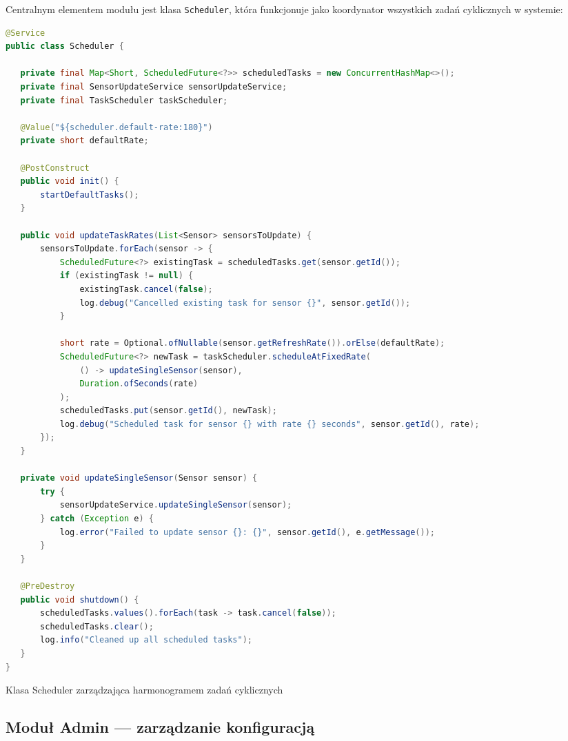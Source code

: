 \documentclass[a4paper,12pt,openany]{book}
\begin{document}
Centralnym elementem modułu jest klasa \texttt{Scheduler}, która funkcjonuje jako koordynator wszystkich zadań cyklicznych w systemie:


\vspace{1em}
\begin{lstlisting}[language=java]
@Service
public class Scheduler {

   private final Map<Short, ScheduledFuture<?>> scheduledTasks = new ConcurrentHashMap<>();
   private final SensorUpdateService sensorUpdateService;
   private final TaskScheduler taskScheduler;

   @Value("${scheduler.default-rate:180}")
   private short defaultRate;

   @PostConstruct
   public void init() {
       startDefaultTasks();
   }

   public void updateTaskRates(List<Sensor> sensorsToUpdate) {
       sensorsToUpdate.forEach(sensor -> {
           ScheduledFuture<?> existingTask = scheduledTasks.get(sensor.getId());
           if (existingTask != null) {
               existingTask.cancel(false);
               log.debug("Cancelled existing task for sensor {}", sensor.getId());
           }

           short rate = Optional.ofNullable(sensor.getRefreshRate()).orElse(defaultRate);
           ScheduledFuture<?> newTask = taskScheduler.scheduleAtFixedRate(
               () -> updateSingleSensor(sensor),
               Duration.ofSeconds(rate)
           );
           scheduledTasks.put(sensor.getId(), newTask);
           log.debug("Scheduled task for sensor {} with rate {} seconds", sensor.getId(), rate);
       });
   }

   private void updateSingleSensor(Sensor sensor) {
       try {
           sensorUpdateService.updateSingleSensor(sensor);
       } catch (Exception e) {
           log.error("Failed to update sensor {}: {}", sensor.getId(), e.getMessage());
       }
   }

   @PreDestroy
   public void shutdown() {
       scheduledTasks.values().forEach(task -> task.cancel(false));
       scheduledTasks.clear();
       log.info("Cleaned up all scheduled tasks");
   }
}
\end{lstlisting}
\caption{Klasa Scheduler zarządzająca harmonogramem zadań cyklicznych}
\label{lst:scheduler}

\subsection{Moduł Admin --- zarządzanie konfiguracją}
\end{document}
